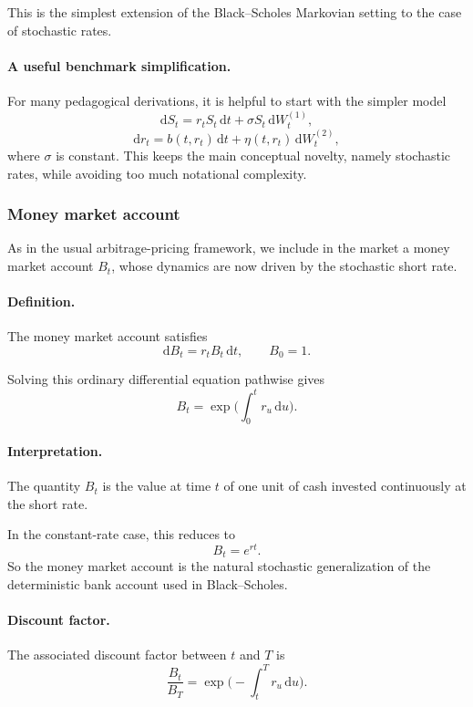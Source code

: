 \documentclass[11pt]{article}
\theoremstyle{plain}
\theoremstyle{definition}
\theoremstyle{remark}
\begin{document}
This is the simplest extension of the Black--Scholes Markovian setting
to the case of stochastic rates.

\paragraph{A useful benchmark simplification.}
For many pedagogical derivations, it is helpful to start with the
simpler model
\[
\mathrm{d}S_t
=
r_tS_t\,\mathrm{d}t
+
\sigma S_t\,\mathrm{d}W_t^{(1)},
\]
\[
\mathrm{d}r_t
=
b(t,r_t)\,\mathrm{d}t
+
\eta(t,r_t)\,\mathrm{d}W_t^{(2)},
\]
where \(\sigma\) is constant.
This keeps the main conceptual novelty, namely stochastic rates, while
avoiding too much notational complexity.

\subsubsection{Money market account}

As in the usual arbitrage-pricing framework, we include in the market a
money market account \(B_t\), whose dynamics are now driven by the
stochastic short rate.

\paragraph{Definition.}
The money market account satisfies
\[
\mathrm{d}B_t=r_tB_t\,\mathrm{d}t,
\qquad
B_0=1.
\]

Solving this ordinary differential equation pathwise gives
\[
\boxed{
B_t=\exp\!\Big(\int_0^t r_u\,\mathrm{d}u\Big).
}
\]

\paragraph{Interpretation.}
The quantity \(B_t\) is the value at time \(t\) of one unit of cash
invested continuously at the short rate.

In the constant-rate case, this reduces to
\[
B_t=e^{rt}.
\]
So the money market account is the natural stochastic generalization of
the deterministic bank account used in Black--Scholes.

\paragraph{Discount factor.}
The associated discount factor between \(t\) and \(T\) is
\[
\frac{B_t}{B_T}
=
\exp\!\Big(-\int_t^T r_u\,\mathrm{d}u\Big).
\]
\end{document}

